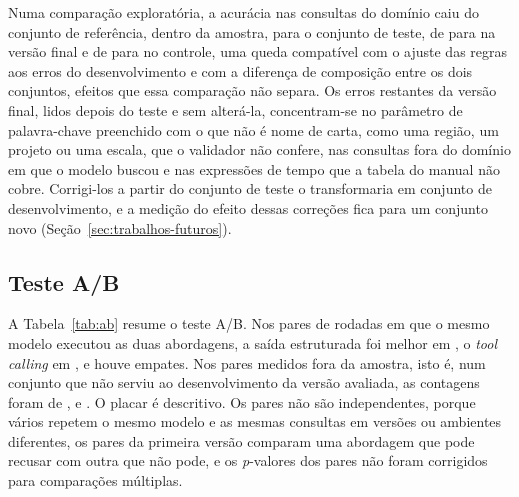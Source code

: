 Numa comparação exploratória, a acurácia nas consultas do domínio caiu do conjunto de referência, dentro da amostra, para o conjunto de teste, de  para  na versão final e de  para  no controle, uma queda compatível com o ajuste das regras aos erros do desenvolvimento e com a diferença de composição entre os dois conjuntos, efeitos que essa comparação não separa. Os erros restantes da versão final, lidos depois do teste e sem alterá-la, concentram-se no parâmetro de palavra-chave preenchido com o que não é nome de carta, como uma região, um projeto ou uma escala, que o validador não confere, nas consultas fora do domínio em que o modelo buscou e nas expressões de tempo que a tabela do manual não cobre. Corrigi-los a partir do conjunto de teste o transformaria em conjunto de desenvolvimento, e a medição do efeito dessas correções fica para um conjunto novo (Seção~\ref{sec:trabalhos-futuros}).

\subsection{Teste A/B}
\label{sec:res-ab}

A Tabela~\ref{tab:ab} resume o teste A/B. Nos  pares de rodadas em que o mesmo modelo executou as duas abordagens, a saída estruturada foi melhor em , o \textit{tool calling} em , e houve  empates. Nos  pares medidos fora da amostra, isto é, num conjunto que não serviu ao desenvolvimento da versão avaliada, as contagens foram de ,  e . O placar é descritivo. Os pares não são independentes, porque vários repetem o mesmo modelo e as mesmas consultas em versões ou ambientes diferentes, os pares da primeira versão comparam uma abordagem que pode recusar com outra que não pode, e os \textit{p}-valores dos pares não foram corrigidos para comparações múltiplas.

